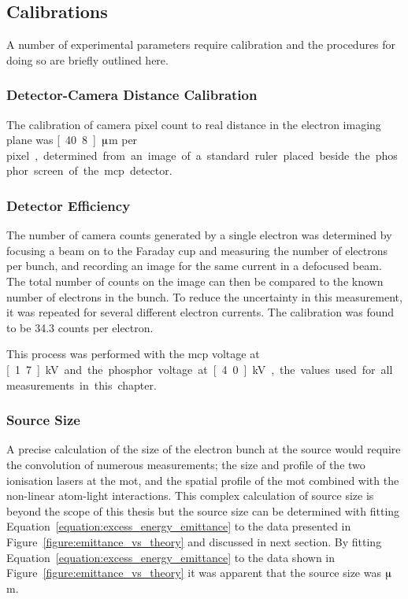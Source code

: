 \subsection{Calibrations}
A number of experimental parameters require calibration and the procedures for doing so are briefly outlined here.

\subsubsection{Detector-Camera Distance Calibration}
The calibration of camera pixel count to real distance in the electron imaging plane was \unit[40.8]{$\muup$m per pixel}, determined from an image of a standard ruler placed beside the phosphor screen of the \gls{mcp} detector.

\subsubsection{Detector Efficiency}
The number of camera counts generated by a single electron was determined by focusing a beam on to the Faraday cup and measuring the number of electrons per bunch, and recording an image for the same current in a defocused beam.
The total number of counts on the image can then be compared to the known number of electrons in the bunch.
To reduce the uncertainty in this measurement, it was repeated for several different electron currents.
The calibration was found to be 34.3 counts per electron.

This process was performed with the \gls{mcp} voltage at \unit[1.7]{kV} and the phosphor voltage at \unit[4.0]{kV}, the values used for all measurements in this chapter.

\subsubsection{Source Size}
A precise calculation of the size of the electron bunch at the source would require the convolution of numerous measurements; the size and profile of the two ionisation lasers at the \gls{mot}, and the spatial profile of the \gls{mot} combined with the non-linear atom-light interactions.
This complex calculation of source size is beyond the scope of this thesis but the source size can be determined with fitting Equation~\ref{equation:excess_energy_emittance} to the data presented in Figure~\ref{figure:emittance_vs_theory} and discussed in next section.
By fitting Equation~\ref{equation:excess_energy_emittance} to the data shown in Figure~\ref{figure:emittance_vs_theory} it was apparent that the source size was \unit[340]{$\muup$m}.

